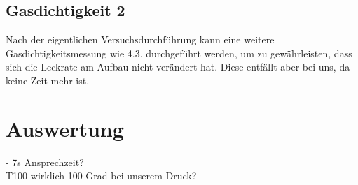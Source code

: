 \documentclass[]{article}
\begin{document}
\subsection{Gasdichtigkeit 2}

Nach der eigentlichen Versuchsdurchführung kann eine weitere Gasdichtigkeitsmessung wie 4.3. durchgeführt werden, um zu gewährleisten, dass sich die Leckrate am Aufbau nicht verändert hat. Diese entfällt aber bei uns, da keine Zeit mehr ist.

\section{Auswertung}
{\color{red}- 7s Ansprechzeit?}\\
{\color{red}T100 wirklich 100 Grad bei unserem Druck?}\\
\end{document}
